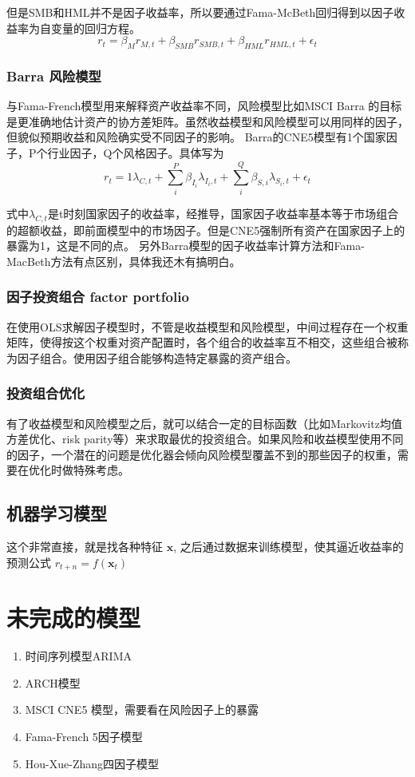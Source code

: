 \documentclass[11pt,oneside,a4paper,notitlepage]{article}
\newcommand{\vect}[1]{\mathbf{#1}}
\begin{document}
\begin{CJK}{UTF8}{gbsn}
但是SMB和HML并不是因子收益率，所以要通过Fama-McBeth回归得到以因子收益率为自变量的回归方程。
$$r_t = \beta_M r_{M,t} + \beta_{SMB}r_{SMB,t} + \beta_{HML} r_{HML,t} + \epsilon_t$$

\subsubsection{Barra 风险模型}
与Fama-French模型用来解释资产收益率不同，风险模型比如MSCI Barra 的目标是更准确地估计资产的协方差矩阵。虽然收益模型和风险模型可以用同样的因子，但貌似预期收益和风险确实受不同因子的影响。
Barra的CNE5模型有1个国家因子，P个行业因子，Q个风格因子。具体写为
  $$r_t = 1\lambda_{C,t} + \sum_i^P{\beta_{I_i}\lambda_{I_i, t}} + \sum_i^Q{\beta_{S,i}\lambda_{S_i, t}} +\epsilon_t $$

式中$\lambda_{C,t}$是t时刻国家因子的收益率，经推导，国家因子收益率基本等于市场组合的超额收益，即前面模型中的市场因子。但是CNE5强制所有资产在国家因子上的暴露为1，这是不同的点。
另外Barra模型的因子收益率计算方法和Fama-MacBeth方法有点区别，具体我还木有搞明白。
\subsubsection{因子投资组合 factor portfolio}
在使用OLS求解因子模型时，不管是收益模型和风险模型，中间过程存在一个权重矩阵，使得按这个权重对资产配置时，各个组合的收益率互不相交，这些组合被称为因子组合。使用因子组合能够构造特定暴露的资产组合。

\subsubsection{投资组合优化}
有了收益模型和风险模型之后，就可以结合一定的目标函数（比如Markovitz均值方差优化、risk parity等）来求取最优的投资组合。如果风险和收益模型使用不同的因子，一个潜在的问题是优化器会倾向风险模型覆盖不到的那些因子的权重，需要在优化时做特殊考虑。

\subsection{机器学习模型}
这个非常直接，就是找各种特征 $\vect x$, 之后通过数据来训练模型，使其逼近收益率的预测公式 $r_{t+n} = f(\vect x_t)$

\section{未完成的模型}
\begin{enumerate}
    \item 时间序列模型ARIMA
    \item ARCH模型
    \item MSCI CNE5 模型，需要看在风险因子上的暴露
    \item Fama-French 5因子模型
    \item Hou-Xue-Zhang四因子模型
\end{enumerate}


\end{CJK}
\end{document}
